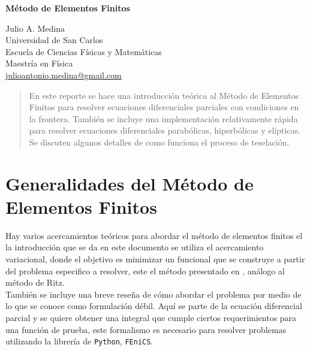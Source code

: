 \documentclass[a4paper]{article}
\begin{document}

\Large
 \begin{center}
\textbf{Método de Elementos Finitos}\\


\hspace{10pt}

\large
Julio A. Medina\\
\hspace{10pt}
\small  
Universidad de San Carlos\\
Escuela de Ciencias Físicas y Matemáticas\\
Maestría en Física\\
\href{mailto:julioantonio.medina@gmail.com}{julioantonio.medina@gmail.com}\\

\end{center}

\hspace{10pt}

\normalsize
\begin{abstract}
En este reporte se hace una introducción teórica al Método de Elementos Finitos para resolver ecuaciones diferenciales parciales con condiciones en la frontera. También se incluye una implementación relativamente rápida para resolver ecuaciones diferenciales parabólicas, hiperbólicas y elípticas. Se discuten algunos detalles de como funciona el proceso de teselación. 
\end{abstract}
\section{Generalidades del Método de Elementos Finitos}
Hay varios acercamientos teóricos para abordar el método de elementos finitos el la introducción que se da en este documento se utiliza el acercamiento variacional, donde el objetivo es minimizar un funcional que se construye a partir del problema especifico a resolver, este el método presentado en \cite{Burden}, análogo al método de Ritz.\\
También se incluye una breve reseña de cómo abordar el problema por medio de lo que se conoce como formulación débil. Aquí se parte de la ecuación diferencial parcial y se quiere obtener una integral que cumple ciertos requerimientos para una función de prueba, este formalismo es necesario para resolver problemas utilizando la librería de \texttt{Python}, \texttt{FEniCS}.
\end{document}

